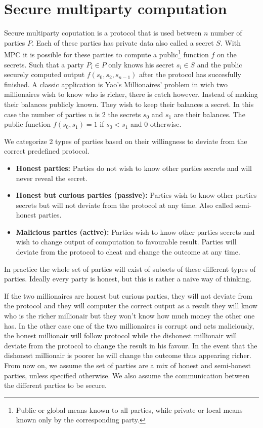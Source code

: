 \section{Secure multiparty computation}
\label{Secure multiparty computation}
Secure multiparty coputation is a protocol that is used between $n$ number of parties $P$. Each of these parties has private data also called a secret $S$. With MPC it is possible for these parties to compute a public\footnote{Public or global means known to all parties, while private or local means known only by the corresponding party.} function $f$ on the secrets. Such that a party $P_i \in P$ only knows his secret $s_i \in S$ and the public securely computed output $f(s_0,s_2,s_{n-1})$ after the protocol has succesfully finished.
\newline
A classic application is Yao's Millionaires' problem \cite{yao1982protocols} in wich two millionaires wish to know who is richer, there is catch however. Instead of making their balances publicly known. They wish to keep their balances a secret. In this case the number of parties $n$ is 2 the secrets $s_0$ and $s_1$ are their balances. The public function $f(s_0,s_1)=1$ if $s_0<s_1$ and $0$ otherwise.

We categorize 2 types of parties based on their willingness to deviate from the correct predefined protocol.
\begin{itemize}
  \item \textbf{Honest parties:} Parties do not wish to know other parties secrets and will never reveal the secret.
  \item \textbf{Honest but curious parties (passive):} Parties wish to know other parties secrets but will not deviate from the protocol at any time. Also called semi-honest parties.
  \item \textbf{Malicious parties (active):} Parties wish to know other parties secrets and wish to change output of computation to favourable result. Parties will deviate from the protocol to cheat and change the outcome at any time.
\end{itemize}
In practice the whole set of parties will exist of subsets of these different types of parties. Ideally every party is honest, but this is rather a naive way of thinking.


If the two millionaires are honest but curious parties, they will not deviate from the protocol and they will computer the correct output as a result they will know who is the richer millionair but they won't know how much money the other one has. In the other case one of the two millionaires is corrupt and acts maliciously, the honest millionair will follow protocol while the dishonest millionair will deviate from the protocol to change the result in his favour. In the event that the dishonest millionair is poorer he will change the outcome thus appearing richer.
From now on, we assume the set of parties are a mix of honest and semi-honest parties, unless specified otherwise. We also assume the communication between the different parties to be secure.


